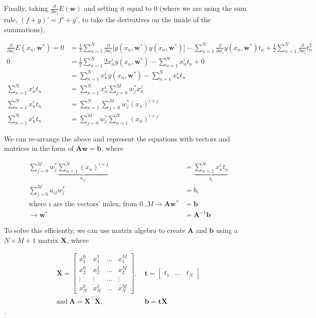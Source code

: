 \documentclass{article}
\begin{document}
Finally, taking $\frac{\partial}{\partial w_i} E(\mathbf{w})$ and setting it equal to 0 (where we are using the sum rule, $(f + g)' = f' + g'$, to take the derivatives on the inside of the summations),

\begin{align*}
    \frac{\partial}{\partial w_i}E(x_n, \mathbf{w}^*) = 0 &= \frac{1}{2}\sum_{n=1}^N \frac{\partial}{\partial w_i} \big[y(x_n, \mathbf{w}^*)y(x_n, \mathbf{w}^*) \big] - \sum_{n=1}^N\frac{\partial}{\partial w_i}y(x_n, \mathbf{w}^*)t_n + \frac{1}{2}\sum_{n=1}^N\frac{\partial}{\partial w_i}t_n^2 \\
                                                  0       &= \frac{1}{2}\sum_{n=1}^N 2x_n^i y(x_n, \mathbf{w}^*) - \sum_{n=1}^Nx_n^it_n + 0 \\
                                                          &= \sum_{n=1}^N x_n^i y(x_n, \mathbf{w}^*) - \sum_{n=1}^Nx_n^it_n \\
                                     \sum_{n=1}^Nx_n^it_n &= \sum_{n=1}^N x_n^i \sum_{j=0}^Mw_j^*x_n^j \\
                                     \sum_{n=1}^Nx_n^it_n &= \sum_{n=1}^N \sum_{j=0}^Mw_j^*(x_n)^{i+j} \\
                                     \sum_{n=1}^Nx_n^it_n &= \sum_{j=0}^Mw_j^*\sum_{n=1}^N(x_n)^{i+j}
\end{align*}

We can re-arrange the above and represent the equations with vectors and matrices in the form of $\mathbf{A}\mathbf{w} = \mathbf{b}$, where

\begin{align*}
    \sum_{j=0}^Mw_j^* \underbrace{\sum_{n=1}^N(x_n)^{i+j}}_{a_{ij}} &= \underbrace{\sum_{n=1}^Nx_n^it_n}_{b_i} \\
    \sum_{j=0}^Ma_{ij} w_j^* &= b_i \\
    \text{where $i$ are the vectors' index, from $0..M$}\rightarrow \mathbf{A} \mathbf{w}^* &= \mathbf{b} \\
    \rightarrow \mathbf{w}^* &= \mathbf{A}^{-1}\mathbf{b}
\end{align*}

To solve this efficiently, we can use matrix algebra to create $\mathbf{A}$ and $\mathbf{b}$ using a $N\times M+1$ matrix $\mathbf{X}$, where

\begin{align*}
    \mathbf{X} =
    \begin{bmatrix}
        x_1^0 & x_1^1 & ... & x_1^M \\
        x_2^0 & x_2^1 & ... & x_2^M \\
        \vdots & \vdots & ... & \vdots \\
        x_N^0 & x_N^1 & ... & x_N^M
    \end{bmatrix}, &~\bm{t} =
        \begin{bmatrix}
            t_1 & ... & t_N
        \end{bmatrix} \\
        \text{and}~\mathbf{A} = \mathbf{X}^\top\mathbf{X}, &~\mathbf{b} = \bm{t}\mathbf{X}
\end{align*}.
\end{document}
